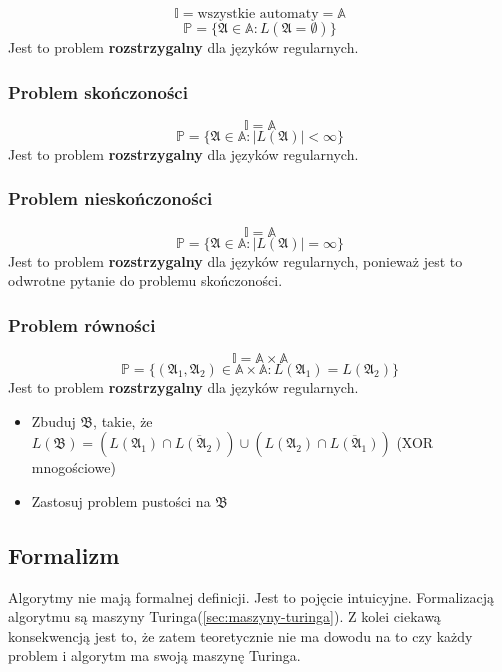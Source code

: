 \documentclass{../notatki}
\begin{document}
$$
\mathbb{I} = \text{wszystkie automaty} = \mathbb{A}
$$
$$
\mathbb{P} = \{\mathfrak{A} \in \mathbb{A} : L(\mathfrak{A} = \emptyset)\}
$$
Jest to problem \textbf{rozstrzygalny} dla języków regularnych.

\subsubsection{Problem skończoności}

$$
\mathbb{I} = \mathbb{A}
$$
$$
\mathbb{P} = \{\mathfrak{A} \in \mathbb{A} : |L(\mathfrak{A})| < \infty\}
$$
Jest to problem \textbf{rozstrzygalny} dla języków regularnych.

\subsubsection{Problem nieskończoności}

$$
\mathbb{I} = \mathbb{A}
$$
$$
\mathbb{P} = \{\mathfrak{A} \in \mathbb{A} : |L(\mathfrak{A})| = \infty\}
$$
Jest to problem \textbf{rozstrzygalny} dla języków regularnych,
ponieważ jest to odwrotne pytanie do problemu skończoności.

\subsubsection{Problem równości}

$$
\mathbb{I} = \mathbb{A} \times \mathbb{A}
$$
$$
\mathbb{P} = \{(\mathfrak{A}_1, \mathfrak{A}_2) \in \mathbb{A} \times
\mathbb{A} : L(\mathfrak{A}_1) = L(\mathfrak{A}_2)\}
$$
Jest to problem \textbf{rozstrzygalny} dla języków regularnych.

\begin{itemize}
  \item Zbuduj $\mathfrak{B}$, takie, że $L(\mathfrak{B}) =
    (L(\mathfrak{A_1}) \cap \overline{L(\mathfrak{A_2})}) \cup
    (L(\mathfrak{A_2}) \cap \overline{L(\mathfrak{A_1})})$ (XOR mnogościowe)
  \item Zastosuj problem pustości na $\mathfrak{B}$
\end{itemize}

\subsection{Formalizm}

Algorytmy nie mają formalnej definicji. Jest to pojęcie intuicyjne.
Formalizacją algorytmu są maszyny Turinga(\ref{sec:maszyny-turinga}).
Z kolei ciekawą konsekwencją jest to, że zatem teoretycznie nie ma dowodu na to
czy każdy problem i algorytm ma swoją maszynę Turinga.
\end{document}
